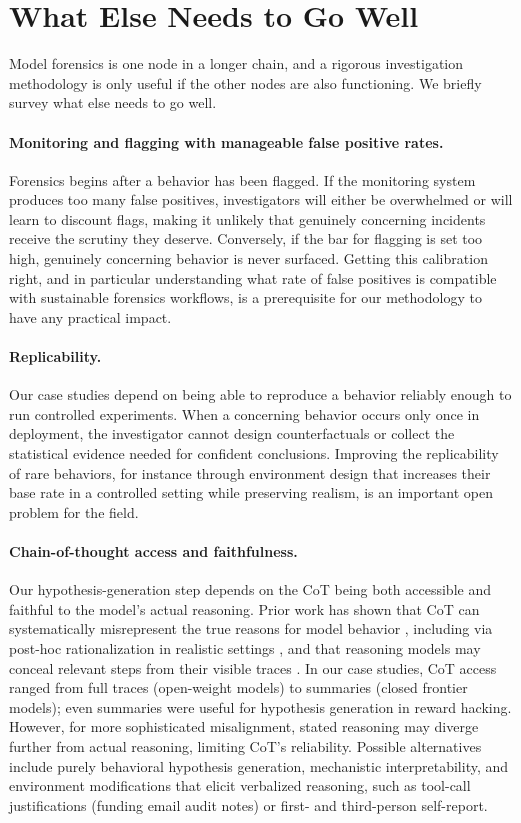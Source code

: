 \documentclass{article}
\begin{document}
\section{What Else Needs to Go Well}
\label{app:what-else}

Model forensics is one node in a longer chain, and a rigorous investigation methodology is only useful if the other nodes are also functioning. We briefly survey what else needs to go well.

\paragraph{Monitoring and flagging with manageable false positive rates.} Forensics begins after a behavior has been flagged. If the monitoring system produces too many false positives, investigators will either be overwhelmed or will learn to discount flags, making it unlikely that genuinely concerning incidents receive the scrutiny they deserve. Conversely, if the bar for flagging is set too high, genuinely concerning behavior is never surfaced. Getting this calibration right, and in particular understanding what rate of false positives is compatible with sustainable forensics workflows, is a prerequisite for our methodology to have any practical impact.

\paragraph{Replicability.} Our case studies depend on being able to reproduce a behavior reliably enough to run controlled experiments. When a concerning behavior occurs only once in deployment, the investigator cannot design counterfactuals or collect the statistical evidence needed for confident conclusions. Improving the replicability of rare behaviors, for instance through environment design that increases their base rate in a controlled setting while preserving realism, is an important open problem for the field.

\paragraph{Chain-of-thought access and faithfulness.} Our hypothesis-generation step depends on the CoT being both accessible and faithful to the model's actual reasoning. Prior work has shown that CoT can systematically misrepresent the true reasons for model behavior \citep{turpin2023unfaithful, lanham2023faithfulness}, including via post-hoc rationalization in realistic settings \citep{arcuschin2025unfaithful}, and that reasoning models may conceal relevant steps from their visible traces \citep{chen2025reasoning}. In our case studies, CoT access ranged from full traces (open-weight models) to summaries (closed frontier models); even summaries were useful for hypothesis generation in reward hacking. However, for more sophisticated misalignment, stated reasoning may diverge further from actual reasoning, limiting CoT's reliability. Possible alternatives include purely behavioral hypothesis generation, mechanistic interpretability, and environment modifications that elicit verbalized reasoning, such as tool-call justifications (funding email audit notes) or first- and third-person self-report.
\end{document}

